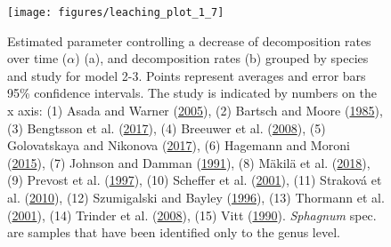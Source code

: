 \documentclass[
  12pt,
]{article}
\begin{document}
\begin{figure}[H]

{\centering \texttt{[image: figures/leaching\_plot\_1\_7]} 

}

\caption{Estimated parameter controlling a decrease of decomposition rates over time (\(\alpha\)) (a), and decomposition rates (b) grouped by species and study for model 2-3. Points represent averages and error bars 95\% confidence intervals. The study is indicated by numbers on the x axis: (1) Asada and Warner (\protect\hyperlink{ref-Asada.2005b}{2005}), (2) Bartsch and Moore (\protect\hyperlink{ref-Bartsch.1985}{1985}), (3) Bengtsson et al. (\protect\hyperlink{ref-Bengtsson.2017}{2017}), (4) Breeuwer et al. (\protect\hyperlink{ref-Breeuwer.2008}{2008}), (5) Golovatskaya and Nikonova (\protect\hyperlink{ref-Golovatskaya.2017}{2017}), (6) Hagemann and Moroni (\protect\hyperlink{ref-Hagemann.2015}{2015}), (7) Johnson and Damman (\protect\hyperlink{ref-Johnson.1991}{1991}), (8) Mäkilä et al. (\protect\hyperlink{ref-Makila.2018}{2018}), (9) Prevost et al. (\protect\hyperlink{ref-Prevost.1997}{1997}), (10) Scheffer et al. (\protect\hyperlink{ref-Scheffer.2001}{2001}), (11) Straková et al. (\protect\hyperlink{ref-Strakova.2010}{2010}), (12) Szumigalski and Bayley (\protect\hyperlink{ref-Szumigalski.1996}{1996}), (13) Thormann et al. (\protect\hyperlink{ref-Thormann.2001}{2001}), (14) Trinder et al. (\protect\hyperlink{ref-Trinder.2008}{2008}), (15) Vitt (\protect\hyperlink{ref-Vitt.1990}{1990}). \emph{Sphagnum} spec. are samples that have been identified only to the genus level.}\label{fig:sup-out-mm35-1-p5}
\end{figure}
\end{document}
